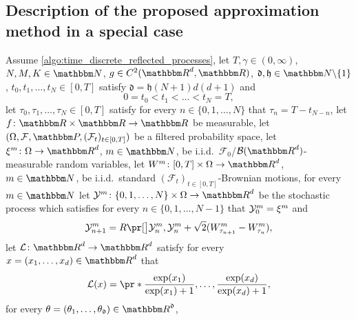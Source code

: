 
\subsection{Description of the proposed approximation method in a special case}
\label{subsec:algo_spec}

\begin{algo}
	\label{algo:special_case}
	Assume 
		\cref{algo:time_discrete_reflected_processes},
	let
		$T,\gamma\in (0,\infty)$,
		$N,M,K \in\N$, 
		$g \in C^2(\R^d,\R)$,
		$\mathfrak d,\mathfrak{h} \in \N \backslash \{1\}$,
		$t_0,t_1,\ldots,t_N\in [0,T]$ 
	satisfy
		$\mathfrak{d} = \mathfrak{h}(N+1)d(d+1)$
	and
	\begin{equation}
		\label{eq:algo_spec_times}
		0 = t_0 < t_1 < \ldots < t_N = T
		,
	\end{equation}
	let 
		$\tau_0, \tau_1, \dots,\tau_N \in [0,T]$ 
	satisfy 
		for every 
			$n \in \{0,1,\dots,N\}$ 
		that 
			$\tau_n= T-t_{N-n}$,
	let
		$f \colon \R \times \R \to \R$
		be measurable,
	let
		$(\Omega,\F,\P,(\mathcal{F}_t)_{t\in [0,T]})$
		be a filtered probability space,
	let
		$\xi^{m}\colon\Omega\to\R^d$, $m\in\N$,
		be i.i.d.\ $\mathcal{F}_0$/$\B(\R^d)$-measurable random variables,
	let
		$W^{m}\colon [0,T]\times \Omega \to\R^d$, $m\in\N$, 
		be i.i.d.\ standard	$(\mathcal{F}_t)_{t\in [0,T]}$-Brownian motions,
	for every
		$m\in\N$
	let
		$\Y^{m}\colon \{0,1,\ldots,N\}\times\Omega\to\R^d$
		be the stochastic process 
		which satisfies 
			for every 
				$n\in\{0,1,\ldots,N-1\}$   
			that
				${\mathcal{Y}}^{m}_0 = \xi^{m}$ and
				\begin{equation}\label{Y-algo-spez}
					\Y^{m}_{n+1}
					=
					R\bpr{\Y^{m}_{n}, \Y^{m}_{n} + \sqrt{2} (W^{m}_{\tau_{n+1}}-W^{m}_{\tau_{n}})}
					,
				\end{equation}
	let 
		$ \mathcal{L} \colon \R^d \to \R^d $ 
	satisfy 
		for every 
			$ x = ( x_1, \dots, x_d ) \in \R^d $ 
		that
		\begin{equation}
			\label{eq:activation}
			\mathcal{L}( x )
			=
			\pr*{\frac{\exp(x_1)}{\exp(x_1)+1},\dots,\frac{\exp(x_d)}{\exp(x_d)+1}}
			,
		\end{equation}
	for every 
		$ \theta = ( \theta_1, \dots, \theta_{ \mathfrak{d} } ) \in \R^{ \mathfrak{d} }$,

\end{algo}
